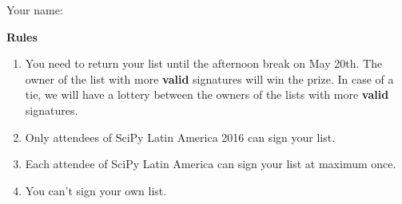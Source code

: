 \documentclass[12pt]{article}
\begin{document}
\thispagestyle{empty}

\vspace*{4cm}

\begin{center}
\end{center}

Your name: \hrulefill

\begin{center}
  \textbf{Rules}
\end{center}

\begin{enumerate}
  \item You need to return your list until the afternoon break on May 20th.
    The owner of the list with more \textbf{valid} signatures will win the prize.
    In case of a tie, we will have a lottery between the owners of the lists
    with more \textbf{valid} signatures.
  \item Only attendees of SciPy Latin America 2016 can sign your list.
  \item Each attendee of SciPy Latin America can sign your list at maximum once.
  \item You can't sign your own list.
\end{enumerate}
\end{document}
